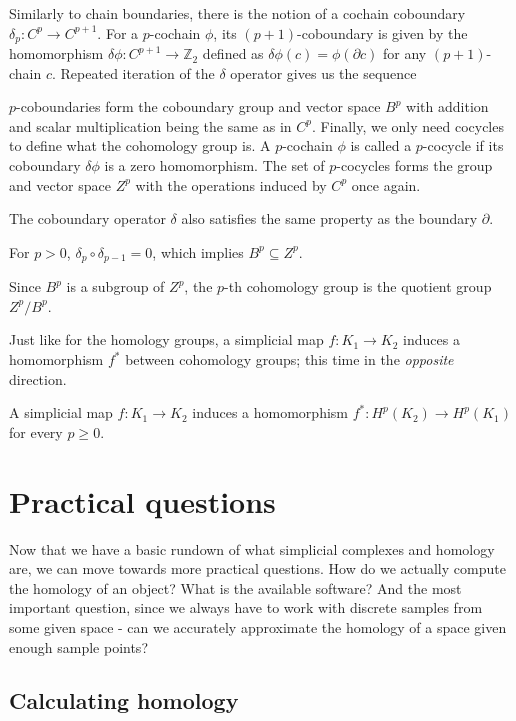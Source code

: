 Similarly to chain boundaries, there is the notion of a cochain coboundary $\delta_{p}: C^{p} \to C^{p+1}$. For a $p$-cochain $\phi$, its $(p+1)$-coboundary is given by the homomorphism $\delta \phi: C^{p+1} \to \mathbb{Z}_{2}$ defined as $\delta \phi(c) = \phi(\partial c)$ for any $(p+1)$-chain $c$. Repeated iteration of the $\delta$ operator gives us the sequence

\begin{figure}[h]
\centering
{}
\end{figure}

$p$-coboundaries form the coboundary group and vector space $B^{p}$ with addition and scalar multiplication being the same as in $C^{p}$. Finally, we only need cocycles to define what the cohomology group is. A $p$-cochain $\phi$ is called a $p$-cocycle if its coboundary $\delta \phi$ is a zero homomorphism. The set of $p$-cocycles forms the group and vector space $Z^{p}$ with the operations induced by $C^{p}$ once again.

The coboundary operator $\delta$ also satisfies the same property as the boundary $\partial$.

\begin{lemma}
For $p >0$, $\delta_{p} \circ \delta_{p-1} = 0$, which implies $B^{p} \subseteq Z^{p}$.
\end{lemma}

\begin{definition}
Since $B^{p}$ is a subgroup of $Z^{p}$, the $p$-th cohomology group is the quotient group $Z^{p} / B^{p}$.
\end{definition}

Just like for the homology groups, a simplicial map $f: K_{1} \to K_{2}$ induces a homomorphism $f^{*}$ between cohomology groups; this time in the \textit{opposite} direction.

\begin{lemma}
A simplicial map $f: K_{1} \to K_{2}$ induces a homomorphism $f^{*}: H^{p}(K_{2}) \to H^{p}(K_{1})$ for every $p \geq 0$.
\end{lemma}

\section{Practical questions}

Now that we have a basic rundown of what simplicial complexes and homology are, we can move towards more practical questions. How do we actually compute the homology of an object? What is the available software? And the most important question, since we always have to work with discrete samples from some given space - can we accurately approximate the homology of a space given enough sample points?

\subsection{Calculating homology}

